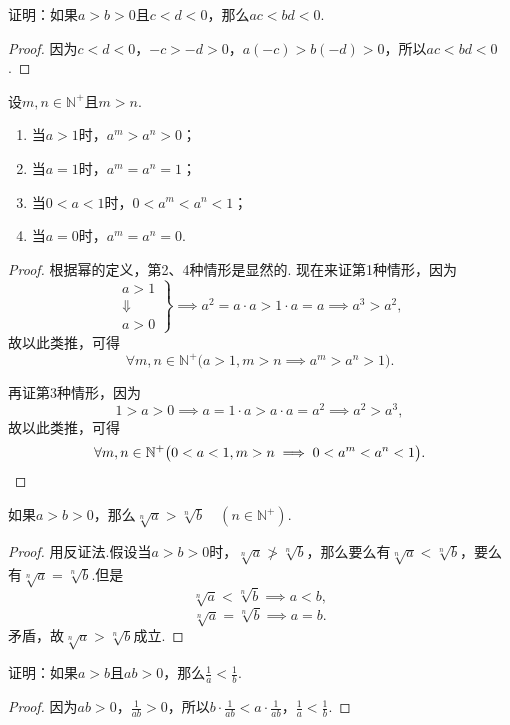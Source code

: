 \begin{example}
证明：如果\(a > b > 0\)且\(c < d < 0\)，那么\(ac < bd < 0\).
\begin{proof}
因为\(c < d < 0\)，\(-c > -d > 0\)，\(a(-c) > b(-d) > 0\)，所以\(ac < bd < 0\).
\end{proof}
\end{example}

\begin{corollary}\label{corollary:不等式.正整数次幂的序}
设\(m,n\in\mathbb{N}^+\)且\(m>n\).
\begin{enumerate}
\item 当\(a>1\)时，\(a^m > a^n > 0\)；
\item 当\(a=1\)时，\(a^m = a^n = 1\)；
\item 当\(0<a<1\)时，\(0 < a^m < a^n < 1\)；
\item 当\(a=0\)时，\(a^m = a^n = 0\).
\end{enumerate}
\begin{proof}
根据幂的定义，第2、4种情形是显然的.
现在来证第1种情形，因为\[
\left. \begin{array}{c}
a>1 \\
\Downarrow \\
a>0
\end{array} \right\}
\implies
a^2 = a \cdot a > 1 \cdot a = a
\implies
a^3 > a^2,
\]故以此类推，可得\[
\forall m,n\in\mathbb{N}^+ \bigl(
	a>1,m>n \implies a^m > a^n > 1
\bigr).
\]

再证第3种情形，因为\[
1>a>0
\implies
a = 1 \cdot a > a \cdot a = a^2
\implies
a^2 > a^3,
\]故以此类推，可得\[
\forall m,n\in\mathbb{N}^+ \bigl(
	0<a<1,m>n \implies 0 < a^m < a^n < 1
\bigr).
\qedhere
\]
\end{proof}
\end{corollary}

\begin{theorem}
如果\(a>b>0\)，那么\(\sqrt[n]a > \sqrt[n]b \quad (n\in\mathbb{N}^+)\).
\begin{proof}
用反证法.假设当\(a>b>0\)时，\(\sqrt[n]{a} \ngtr \sqrt[n]{b}\)，那么要么有\(\sqrt[n]{a} < \sqrt[n]{b}\)，要么有\(\sqrt[n]{a} = \sqrt[n]{b}\).但是\[
\sqrt[n]{a} < \sqrt[n]{b} \implies a<b,
\]\[
\sqrt[n]{a} = \sqrt[n]{b} \implies a=b.
\]矛盾，故\(\sqrt[n]{a}>\sqrt[n]{b}\)成立.
\end{proof}
\end{theorem}

\begin{example}
证明：如果\(a > b\)且\(ab > 0\)，那么\(\frac{1}{a} < \frac{1}{b}\).
\begin{proof}
因为\(ab > 0\)，\(\frac{1}{ab} > 0\)，所以\(b \cdot \frac{1}{ab} < a \cdot \frac{1}{ab}\)，\(\frac{1}{a} < \frac{1}{b}\).
\end{proof}
\end{example}


